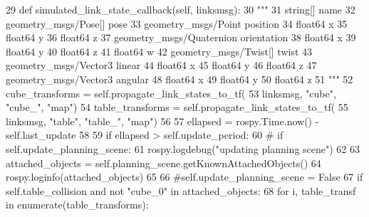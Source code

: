 \begin{DoxyCode}
29     \textcolor{keyword}{def }simulated\_link\_state\_callback(self, linksmsg):
30         \textcolor{stringliteral}{"""}
31 \textcolor{stringliteral}{        string[] name}
32 \textcolor{stringliteral}{        geometry\_msgs/Pose[] pose}
33 \textcolor{stringliteral}{          geometry\_msgs/Point position}
34 \textcolor{stringliteral}{            float64 x}
35 \textcolor{stringliteral}{            float64 y}
36 \textcolor{stringliteral}{            float64 z}
37 \textcolor{stringliteral}{          geometry\_msgs/Quaternion orientation}
38 \textcolor{stringliteral}{            float64 x}
39 \textcolor{stringliteral}{            float64 y}
40 \textcolor{stringliteral}{            float64 z}
41 \textcolor{stringliteral}{            float64 w}
42 \textcolor{stringliteral}{        geometry\_msgs/Twist[] twist}
43 \textcolor{stringliteral}{          geometry\_msgs/Vector3 linear}
44 \textcolor{stringliteral}{            float64 x}
45 \textcolor{stringliteral}{            float64 y}
46 \textcolor{stringliteral}{            float64 z}
47 \textcolor{stringliteral}{          geometry\_msgs/Vector3 angular}
48 \textcolor{stringliteral}{            float64 x}
49 \textcolor{stringliteral}{            float64 y}
50 \textcolor{stringliteral}{            float64 z}
51 \textcolor{stringliteral}{        """}
52         cube\_transforms = self.propagate\_link\_states\_to\_tf(
53             linksmsg, \textcolor{stringliteral}{"cube"}, \textcolor{stringliteral}{"cube\_"}, \textcolor{stringliteral}{"map"})
54         table\_transforms = self.propagate\_link\_states\_to\_tf(
55             linksmsg, \textcolor{stringliteral}{"table"}, \textcolor{stringliteral}{"table\_"}, \textcolor{stringliteral}{"map"})
56 
57         ellapsed = rospy.Time.now() - self.last\_update
58 
59         \textcolor{keywordflow}{if} ellapsed > self.update\_period:
60             \textcolor{comment}{# if self.update\_planning\_scene:}
61             rospy.logdebug(\textcolor{stringliteral}{"updating planning scene"})
62 
63             attached\_objects = self.planning\_scene.getKnownAttachedObjects()
64             rospy.loginfo(attached\_objects)
65 
66             \textcolor{comment}{#self.update\_planning\_scene = False}
67             \textcolor{keywordflow}{if} self.table\_collision \textcolor{keywordflow}{and} \textcolor{keywordflow}{not} \textcolor{stringliteral}{"cube\_0"} \textcolor{keywordflow}{in} attached\_objects:
68                 \textcolor{keywordflow}{for} i, table\_transf \textcolor{keywordflow}{in} enumerate(table\_transforms):

\end{DoxyCode}
